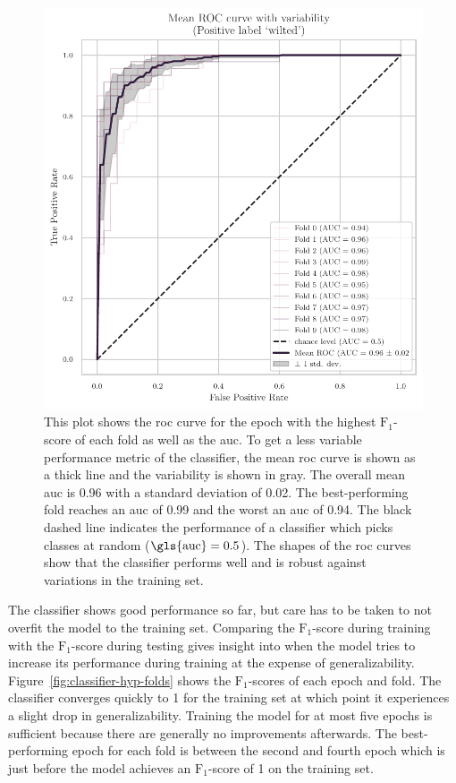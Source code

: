 \documentclass[draft,final]{vutinfth} %
\begin{document}
\begin{figure}
  \centering
  \includegraphics{graphics/classifier-hyp-folds-roc.pdf}
  \caption[Mean \gls{roc} and variability of hyper-parameter-optimized
  model.]{This plot shows the \gls{roc} curve for the epoch with the
    highest $\mathrm{F}_1$-score of each fold as well as the
    \gls{auc}. To get a less variable performance metric of the
    classifier, the mean \gls{roc} curve is shown as a thick line and
    the variability is shown in gray. The overall mean \gls{auc} is
    0.96 with a standard deviation of 0.02. The best-performing fold
    reaches an \gls{auc} of 0.99 and the worst an \gls{auc} of
    0.94. The black dashed line indicates the performance of a
    classifier which picks classes at random
    ($\mathrm{\gls{auc}} = 0.5$). The shapes of the \gls{roc} curves
    show that the classifier performs well and is robust against
    variations in the training set.}
  \label{fig:classifier-hyp-roc}
\end{figure}

The classifier shows good performance so far, but care has to be taken
to not overfit the model to the training set. Comparing the
$\mathrm{F}_1$-score during training with the $\mathrm{F}_1$-score
during testing gives insight into when the model tries to increase its
performance during training at the expense of
generalizability. Figure~\ref{fig:classifier-hyp-folds} shows the
$\mathrm{F}_1$-scores of each epoch and fold. The classifier converges
quickly to 1 for the training set at which point it experiences a
slight drop in generalizability. Training the model for at most five
epochs is sufficient because there are generally no improvements
afterwards. The best-performing epoch for each fold is between the
second and fourth epoch which is just before the model achieves an
$\mathrm{F}_1$-score of 1 on the training set.
\end{document}
